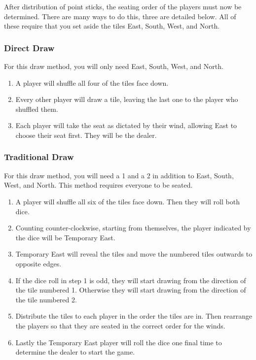 After distribution of point sticks, the seating order of the players must now be determined. There are many ways to do this, three are detailed below. All of these require that you set aside the tiles East, South, West, and North.

\subsubsection*{Direct Draw}\label{core:sssec:direct-draw}

For this draw method, you will only need East, South, West, and North.

\begin{enumerate}
	\item A player will shuffle all four of the tiles face down.
	\item Every other player will draw a tile, leaving the last one to the player who shuffled them.
	\item Each player will take the seat as dictated by their wind, allowing East to choose their seat first. They will be the dealer.
\end{enumerate}

\subsubsection*{Traditional Draw}\label{core:sssec:traditional-draw}

For this draw method, you will need a 1 and a 2 in addition to East, South, West, and North. This method requires everyone to be seated.

\begin{enumerate}
	\item A player will shuffle all six of the tiles face down. Then they will roll both dice.
	\item Counting counter-clockwise, starting from themselves, the player indicated by the dice will be Temporary East.
	\item Temporary East will reveal the tiles and move the numbered tiles outwards to opposite edges.
	\item If the dice roll in step 1 is odd, they will start drawing from the direction of the tile numbered 1. Otherwise they will start drawing from the direction of the tile numbered 2.
	\item Distribute the tiles to each player in the order the tiles are in. Then rearrange the players so that they are seated in the correct order for the winds.
	\item Lastly the Temporary East player will roll the dice one final time to determine the dealer to start the game. 
\end{enumerate}

